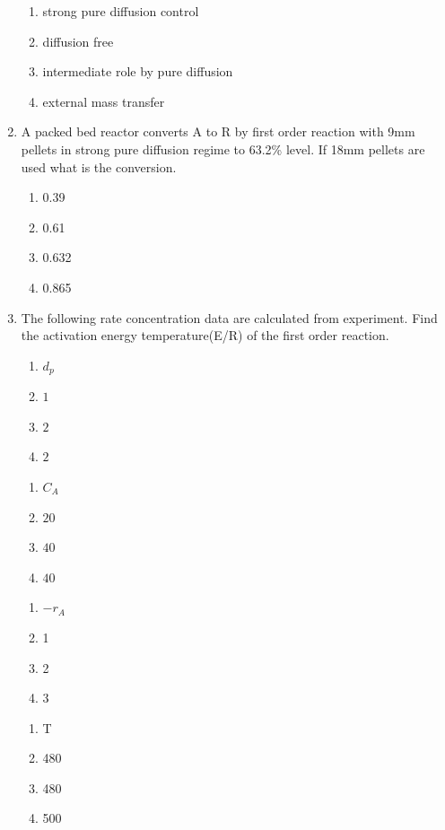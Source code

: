 \documentclass[journal,12pt,onecolumn]{IEEEtran}
\theoremstyle{remark}
\begin{document}
\begin{enumerate}
 \begin{enumerate}
     \item strong pure diffusion control
     \item diffusion free
     \item intermediate role by pure diffusion
     \item external mass transfer
 \end{enumerate}

    \item A packed bed reactor converts A to R by first order reaction with 9mm pellets in strong pure diffusion regime to 63.2\% level. If 18mm pellets are used what is the conversion.

    \begin{multicols}{4}
        \begin{enumerate}
            \item 0.39
            \item 0.61
            \item 0.632
            \item 0.865
        \end{enumerate}
    \end{multicols}

    \item The following rate concentration data are calculated from experiment. Find the activation energy temperature(E/R) of the first order reaction.

    \begin{multicols}{4}
        \begin{enumerate}[label =]
            \item $d_p$
            \item $1$
            \item $2$
            \item $2$
        \end{enumerate}
        \columnbreak
        \begin{enumerate}[label =]
            \item $C_A$
            \item $20$
            \item $40$
            \item $40$
        \end{enumerate}
        \columnbreak
        \begin{enumerate}[label =]
            \item $-r_A$
            \item 1
            \item 2
            \item 3
        \end{enumerate}
        \columnbreak
        \begin{enumerate}[label =]
            \item T
            \item 480
            \item 480
            \item 500
        \end{enumerate}
    \end{multicols}


\end{enumerate}
\end{document}
